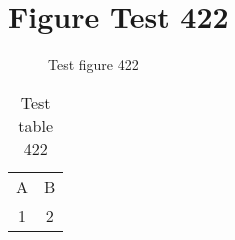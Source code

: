 \documentclass{article}
\begin{document}
\section{Figure Test 422}
\begin{figure}[h]
\caption{Test figure 422}
\end{figure}
\begin{table}[h]
\caption{Test table 422}
\begin{tabular}{cc}
A & B \\
1 & 2
\end{tabular}
\end{table}
\end{document}
